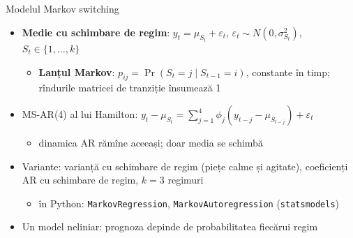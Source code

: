 \begin{frame}{Modelul Markov switching}
\itemsize{\small}
\begin{itemize}
    \item \textbf{Medie cu schimbare de regim}: $y_t = \mu_{S_t} + \varepsilon_t$, \quad $\varepsilon_t \sim N(0, \sigma^2_{S_t})$, \quad $S_t \in \{1, \dots, k\}$
    \begin{itemize}
        \item \textbf{Lanțul Markov}: $p_{ij} = \Pr(S_t = j \mid S_{t-1} = i)$, constante în timp; rîndurile matricei de tranziție însumează 1
    \end{itemize}
    \item MS-AR(4) al lui Hamilton: $y_t - \mu_{S_t} = \sum_{j=1}^{4}\phi_j(y_{t-j} - \mu_{S_{t-j}}) + \varepsilon_t$
    \begin{itemize}
        \item dinamica AR rămîne aceeași; doar media se schimbă
    \end{itemize}
    \item Variante: varianță cu schimbare de regim (piețe calme și agitate), coeficienți AR cu schimbare de regim, $k = 3$ regimuri
    \begin{itemize}
        \item în Python: \texttt{MarkovRegression}, \texttt{MarkovAutoregression} (\texttt{statsmodels})
    \end{itemize}
    \item Un model neliniar: prognoza depinde de probabilitatea fiecărui regim
\end{itemize}
\end{frame}

